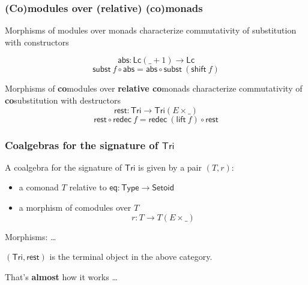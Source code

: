 \documentclass[
]
{beamer}
\newcommand{\constfont}[1]{\ensuremath{\mathsf{#1}}}
\newcommand{\bind}[2]{{#1}\mathbin{\gg\hspace{-.8ex}=}{#2}}
\newcommand{\Tri}{\constfont{Tri}}
\newcommand{\tail}{\constfont{rest}}
\newcommand{\redec}{\constfont{redec}}
\newcommand{\comp}[2]{\ensuremath{{#2} \circ {#1}}}
\newcommand{\shift}{\constfont{shift}}
\newcommand{\lift}{\constfont{lift}}
\newcommand{\subst}{\constfont{subst}}
\newcommand{\Setoid}{\constfont{Setoid}}
\newcommand{\eq}{\ensuremath{\mathsf{eq}}}
\newcommand{\App}{\constfont{app}}
\newcommand{\Abs}{\constfont{abs}}
\newcommand{\LC}{\mathsf{Lc}}
\newcommand{\Set}{\constfont{Type}}
\newcommand{\fat}[1]{\textbf{#1}}
\begin{document}
\begin{frame}
 \frametitle{(Co)modules over (relative) (co)monads}
 \begin{block}{Morphisms of modules over monads}
   characterize commutativity of substitution with constructors

         \[ \Abs : \LC(\_ + 1) \to \LC \]
         \[ \comp{\Abs}{\subst~f} = \comp{\subst~(\shift~f)}{\Abs} \]
 \end{block}

 \begin{block}{Morphisms of \fat{co}modules over \fat{relative co}monads}
   characterize commutativity of \fat{co}substitution with destructors
         \[\tail : \Tri \to \Tri(E\times \_)\]
         \[\comp{\redec~f}{\tail} = \comp{\tail}{\redec~(\lift~f)} \]
 \end{block} 
\end{frame}

\begin{frame}
 \frametitle{Coalgebras for the signature of $\Tri$}
  \begin{definition}
    A coalgebra for the signature of $\Tri$ is given by a pair $(T,r)$:
    \begin{itemize}
     \item a comonad $T$ relative to $\eq: \Set \to \Setoid$
     \item a morphism of comodules over $T$
        \[  r : T \to T(E \times \_) \]
    \end{itemize}
   Morphisms: \ldots
  \end{definition}

 \begin{lemma}
  $(\Tri,\tail)$ is the terminal object in the above category.
 \end{lemma}

 That's \fat{almost} how it works \ldots
  
\end{frame}
\end{document}
